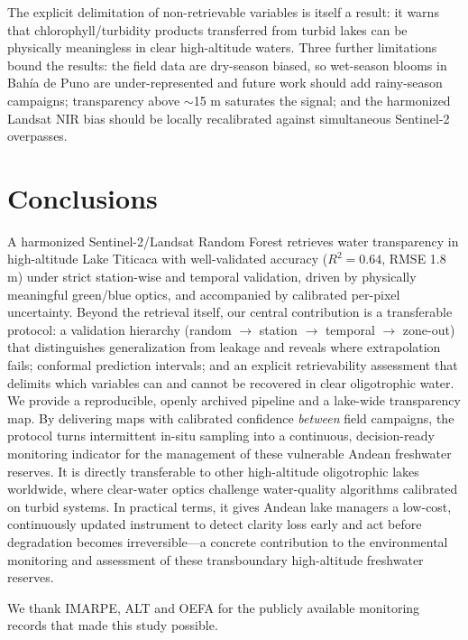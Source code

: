 \documentclass[pdflatex,sn-basic]{sn-jnl}
\begin{document}
The explicit delimitation of non-retrievable variables is itself a result: it warns
that chlorophyll/turbidity products transferred from turbid lakes can be physically
meaningless in clear high-altitude waters. Three further limitations bound the
results: the field data are dry-season biased, so wet-season blooms in Bah\'ia de
Puno are under-represented and future work should add rainy-season campaigns;
transparency above $\sim$15 m saturates the signal; and the harmonized Landsat NIR
bias should be locally recalibrated against simultaneous Sentinel-2 overpasses.

\section{Conclusions}\label{sec:conclusions}
A harmonized Sentinel-2/Landsat Random Forest retrieves water transparency in
high-altitude Lake Titicaca with well-validated accuracy ($R^2=0.64$, RMSE 1.8 m) under
strict station-wise and temporal validation, driven by physically meaningful
green/blue optics, and accompanied by calibrated per-pixel uncertainty. Beyond the
retrieval itself, our central contribution is a transferable protocol: a validation
hierarchy (random $\to$ station $\to$ temporal $\to$ zone-out) that distinguishes
generalization from leakage and reveals where extrapolation fails; conformal
prediction intervals; and an explicit retrievability assessment that delimits which
variables can and cannot be recovered in clear oligotrophic water. We provide a
reproducible, openly archived pipeline and a lake-wide transparency map. By
delivering maps with calibrated confidence \emph{between} field campaigns, the
protocol turns intermittent in-situ sampling into a continuous, decision-ready
monitoring indicator for the management of these vulnerable Andean freshwater
reserves. It is directly transferable to other high-altitude oligotrophic lakes
worldwide, where clear-water optics challenge water-quality algorithms calibrated on
turbid systems. In practical terms, it gives Andean lake managers a low-cost,
continuously updated instrument to detect clarity loss early and act before
degradation becomes irreversible---a concrete contribution to the environmental
monitoring and assessment of these transboundary high-altitude freshwater reserves.

\backmatter

We thank IMARPE, ALT and OEFA for the publicly available monitoring records that
made this study possible.
\end{document}
